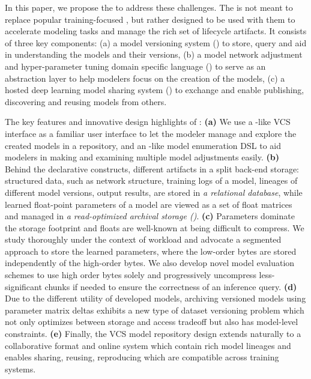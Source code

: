 \documentclass[conference]{IEEEtran}
\begin{document}
In this paper, we propose the \modelhub\system to address these challenges. 
The \modelhub\system is not meant to replace popular training-focused \dnn\systems, but rather designed to be used with them to accelerate modeling tasks and manage the rich set of lifecycle artifacts.
It consists of three key components: (a) a model versioning system (\DLV) to store, query and aid in understanding the models and their versions, (b) a model network adjustment and hyper-parameter tuning domain specific language (\DQL) to serve as an abstraction layer to help modelers focus on the creation of the models, (c) a hosted deep learning model sharing system (\modelhub) to exchange \DLV\repositories and enable publishing, discovering and reusing models from others. 


The key features and innovative design highlights of \modelhub\are: 
\textbf{(a)} We use a -like VCS interface as a familiar user interface to let the modeler manage and explore the created models in a repository, and an -like model enumeration DSL to aid modelers in making and examining multiple model adjustments easily. 
\textbf{(b)} Behind the declarative constructs, \modelhub\manages different artifacts in a split back-end storage: structured data, such as network structure, training logs of a model, lineages of different model versions, output results, are stored in {\em a relational database}, while learned float-point parameters of a model are viewed as a set of float matrices and managed in {\em a read-optimized archival storage (\weightstore)}. 
\textbf{(c)} Parameters dominate the storage footprint and floats are well-known at being difficult to compress. We study \weightstore\implementation thoroughly under the context of \dnn\query workload and advocate a segmented approach  to store the learned parameters, where the low-order bytes are stored independently of the high-order bytes. We also develop novel model evaluation schemes to use high order bytes solely and progressively uncompress less-significant chunks if needed to ensure the correctness of an inference query. 
\textbf{(d)} Due to the different utility of developed models, archiving versioned models using parameter matrix deltas exhibits a new type of dataset versioning problem which not only optimizes between storage and access tradeoff but also has model-level constraints.
\textbf{(e)} Finally, the VCS model repository design extends naturally to a collaborative format and online system which contain rich model lineages and enables sharing, reusing, reproducing \dnn\models which are compatible across training systems.
\end{document}
